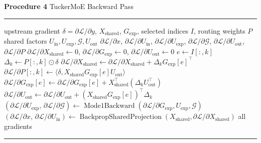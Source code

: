 \documentclass[varwidth=190mm,border=8pt]{standalone}
\begin{document}
\begin{minipage}{180mm}
\small
\noindent\textbf{Procedure 4} TuckerMoE Backward Pass\par
\vspace{2pt}\hrule\vspace{4pt}
\begin{algorithmic}[1]
\Require upstream gradient $\delta = \partial \mathcal{L}/\partial y$, $X_{\mathrm{shared}}$, $G_{\mathrm{exp}}$, selected indices $I$, routing weights $P$
\Statex \hspace{\algorithmicindent} shared factors $U_{\mathrm{in}}, U_{\mathrm{exp}}, \mathcal{G}, U_{\mathrm{out}}$
\Ensure $\partial \mathcal{L}/\partial x$, $\partial \mathcal{L}/\partial U_{\mathrm{in}}$, $\partial \mathcal{L}/\partial U_{\mathrm{exp}}$, $\partial \mathcal{L}/\partial \mathcal{G}$, $\partial \mathcal{L}/\partial U_{\mathrm{out}}$, $\partial \mathcal{L}/\partial P$
\State $\partial \mathcal{L}/\partial X_{\mathrm{shared}} \gets 0$, $\partial \mathcal{L}/\partial G_{\mathrm{exp}} \gets 0$, $\partial \mathcal{L}/\partial U_{\mathrm{out}} \gets 0$
  \State $e \gets I[:, k]$
  \State $\Delta_k \gets P[:, k] \odot \delta$
  \State $\partial \mathcal{L}/\partial X_{\mathrm{shared}} \gets \partial \mathcal{L}/\partial X_{\mathrm{shared}} + \Delta_k G_{\mathrm{exp}}[e]^\top$
  \State $\partial \mathcal{L}/\partial P[:, k] \gets \langle \delta, X_{\mathrm{shared}} G_{\mathrm{exp}}[e] U_{\mathrm{out}} \rangle$
  \State $\partial \mathcal{L}/\partial G_{\mathrm{exp}}[e] \gets \partial \mathcal{L}/\partial G_{\mathrm{exp}}[e] + X_{\mathrm{shared}}^\top(\Delta_k U_{\mathrm{out}}^\top)$
  \State $\partial \mathcal{L}/\partial U_{\mathrm{out}} \gets \partial \mathcal{L}/\partial U_{\mathrm{out}} + (X_{\mathrm{shared}} G_{\mathrm{exp}}[e])^\top \Delta_k$
\EndFor
\State $(\partial \mathcal{L}/\partial U_{\mathrm{exp}},\, \partial \mathcal{L}/\partial \mathcal{G}) \gets \operatorname{Mode1Backward}(\partial \mathcal{L}/\partial G_{\mathrm{exp}}, U_{\mathrm{exp}}, \mathcal{G})$
\State $(\partial \mathcal{L}/\partial x,\, \partial \mathcal{L}/\partial U_{\mathrm{in}}) \gets \operatorname{BackpropSharedProjection}(X_{\mathrm{shared}}, \partial \mathcal{L}/\partial X_{\mathrm{shared}})$
\State \Return all gradients
\end{algorithmic}
\vspace{4pt}\hrule
\end{minipage}
\end{document}
